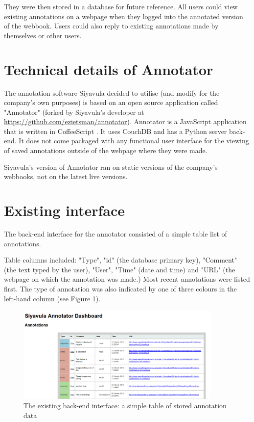 They were then stored in a database for future reference. All users could view existing annotations on a webpage when they logged into the annotated version of the webbook. Users could also reply to existing annotations made by themselves or other users.

\section{Technical details of Annotator}
The annotation software Siyavula decided to utilise (and modify for the company's own purposes) is based on an open source application called "Annotator" \citep{Annotator} (forked by Siyavula's developer at \href{https://github.com/ezietsman/annotator}{https://github.com/ezietsman/annotator}). Annotator is a JavaScript application that is written in CoffeeScript \citep{CoffeeScript}. It uses CouchDB \citep{CouchDB} and has a Python server back-end. It does not come packaged with any functional user interface for the viewing of saved annotations outside of the webpage where they were made.

Siyavula's version of Annotator ran on static versions of the company's webbooks, not on the latest live versions.

\section{Existing interface}
The back-end interface for the annotator consisted of a simple table list of annotations.

Table columns included: "Type", "id" (the database primary key), "Comment" (the text typed by the user), "User", "Time" (date and time) and "URL" (the webpage on which the annotation was made.) Most recent annotations were listed first. The type of annotation was also indicated by one of three colours in the left-hand column (see Figure \ref{fig:ExistingBackEnd}).
\begin{figure}
       \centering
    \includegraphics[width=0.9\textwidth]{Figures/annotator-backend-table.png}
 \caption{The existing back-end interface: a simple table of stored annotation data}
 \label{fig:ExistingBackEnd}
\end{figure}

